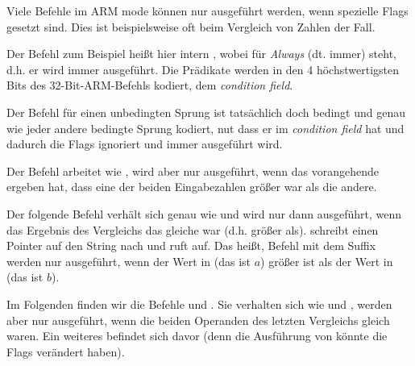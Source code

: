 \label{subsec:jcc_ARM}

\mysubparagraph{\OptimizingKeilVI (\ARMMode)}



Viele Befehle im ARM mode können nur ausgeführt werden, wenn spezielle Flags gesetzt sind.
Dies ist beispielsweise oft beim Vergleich von Zahlen der Fall.

Der \ADD Befehl zum Beispiel heißt hier intern , wobei  für \emph{Always} (dt. immer) steht, d.h. er wird
immer ausgeführt.
Die Prädikate werden in den 4 höchstwertigsten Bits des 32-Bit-ARM-Befehls kodiert, dem \emph{condition field}.

Der Befehl  für einen unbedingten Sprung ist tatsächlich doch bedingt und genau wie jeder andere bedingte Sprung
kodiert, nut dass er  im \emph{condition field} hat und dadurch die Flags ignoriert und immer ausgeführt wird.

Der Befehl  arbeitet wie , wird aber nur ausgeführt, wenn das vorangehende \CMP ergeben hat, dass eine
der beiden Eingabezahlen größer war als die andere. 

Der folgende  Befehl verhält sich genau wie  und wird nur dann ausgeführt, wenn das Ergebnis des
Vergleichs das gleiche war (d.h. größer als).
 schreibt einen Pointer auf den String  nach  und  ruft \printf auf.
Das heißt, Befehl mit dem Suffix  werden nur ausgeführt, wenn der Wert in  (das ist $a$) größer ist als
der Wert in  (das ist $b$).

Im Folgenden finden wir die Befehle  und .
Sie verhalten sich wie  und , werden aber nur ausgeführt, wenn die beiden Operanden des letzten
Vergleichs gleich waren.
Ein weiteres \CMP befindet sich davor (denn die Ausführung von \printf könnte die Flags verändert haben).


